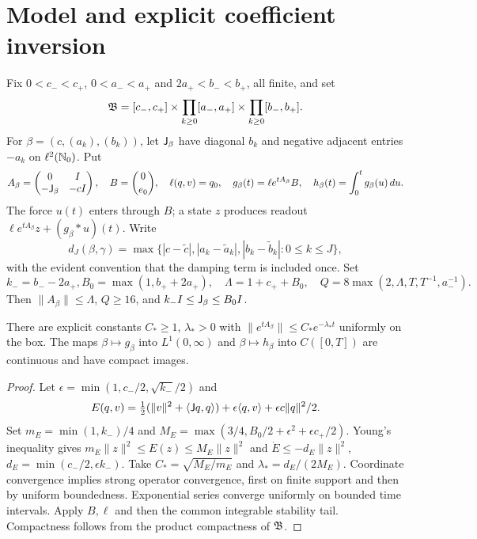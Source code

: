 \section{Model and explicit coefficient inversion}
\label{sec:model}
Fix $0<c_-<c_+$, $0<a_-<a_+$ and $2a_+<b_-<b_+$, all finite, and set
\[
 \mathfrak B=[c_-,c_+]\times\prod_{k\ge0}[a_-,a_+]\times\prod_{k\ge0}[b_-,b_+].
\]
For $\beta=(c,(a_k),(b_k))$, let $\mathsf J_\beta$ have diagonal $b_k$ and
negative adjacent entries $-a_k$ on $\ell^2(\mathbb N_0)$. Put
\[
 A_\beta=\begin{pmatrix}0&I\\-\mathsf J_\beta&-cI\end{pmatrix},\quad
 B=\binom0{e_0},\quad\ell(q,v)=q_0,\quad
 g_\beta(t)=\ell e^{tA_\beta}B,\quad h_\beta(t)=\int_0^t g_\beta(u)\,du.
\]
The force $u(t)$ enters through $B$; a state $z$ produces readout
$\ell e^{tA_\beta}z+(g_\beta*u)(t)$. Write
\[
 d_J(\beta,\gamma)=\max\{|c-\widetilde c|,
 |a_k-\widetilde a_k|,|b_k-\widetilde b_k|:0\le k\le J\},
\]
with the evident convention that the damping term is included once. Set
\[
 k_-=b_--2a_+,
 B_0=\max(1,b_++2a_+),\quad \Lambda=1+c_++B_0,\quad
 Q=8\max(2,\Lambda,T,T^{-1},a_-^{-1}).
\]
Then $\|A_\beta\|\le\Lambda$, $Q\ge16$, and
$k_-I\le\mathsf J_\beta\le B_0I$.

\begin{lemma}
\label{lem:stability}
There are explicit constants $C_*\ge1$, $\lambda_*>0$ with
$\|e^{tA_\beta}\|\le C_*e^{-\lambda_*t}$ uniformly on the box.
The maps $\beta\mapsto g_\beta$ into $L^1(0,\infty)$ and
$\beta\mapsto h_\beta$ into $C([0,T])$ are continuous and have compact images.
\end{lemma}
\begin{proof}
Let $\epsilon=\min(1,c_-/2,\sqrt{k_-}/2)$ and
\[
 E(q,v)=\tfrac12(\|v\|^2+\langle\mathsf J q,q\rangle)
       +\epsilon\langle q,v\rangle+\epsilon c\|q\|^2/2.
\]
Set $m_E=\min(1,k_-)/4$ and
$M_E=\max(3/4,B_0/2+\epsilon^2+\epsilon c_+/2)$.
Young's inequality gives $m_E\|z\|^2\le E(z)\le M_E\|z\|^2$ and
$\dot E\le-d_E\|z\|^2$, $d_E=\min(c_-/2,\epsilon k_-)$.
Take $C_*=\sqrt{M_E/m_E}$ and $\lambda_*=d_E/(2M_E)$.
Coordinate convergence implies strong operator convergence, first on finite
support and then by uniform boundedness. Exponential series converge uniformly
on bounded time intervals. Apply $B,\ell$ and then the common integrable
stability tail. Compactness follows from the product compactness of $\mathfrak B$.
\end{proof}

